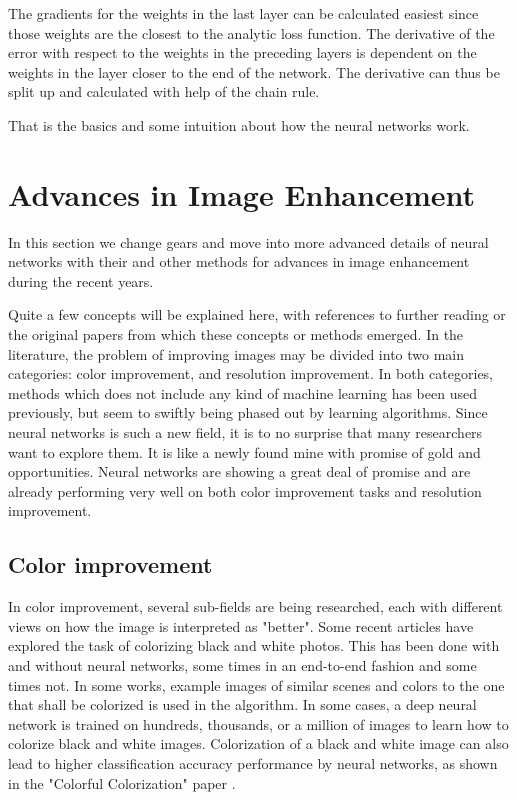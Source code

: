 The gradients for the weights in the last layer can be calculated easiest since those weights are the closest to the analytic loss function. The derivative of the error with respect to the weights in the preceding layers is dependent on the weights in the layer closer to the end of the network. The derivative can thus be split up and calculated with help of the chain rule.  

That is the basics and some intuition about how the neural networks work. 

\section{Advances in Image Enhancement}
In this section we change gears and move into more advanced details of neural networks with their and other methods for advances in image enhancement during the recent years.

Quite a few concepts will be explained here, with references to further reading or the original papers from which these concepts or methods emerged. In the literature, the problem of improving images may be divided into two main categories: color improvement, and resolution improvement. In both categories, methods which does not include any kind of machine learning has been used previously, but seem to swiftly being phased out by learning algorithms. Since neural networks is such a new field, it is to no surprise that many researchers want to explore them. It is like a newly found mine with promise of gold and opportunities. Neural networks are showing a great deal of promise and are already  performing very well on both color improvement tasks and resolution improvement. 


\subsection{Color improvement}
In color improvement, several sub-fields are being researched, each with different views on how the image is interpreted as "better". Some recent articles have explored the task of colorizing black and white photos. This has been done with and without neural networks, some times in an end-to-end fashion and some times not. In some works, example images of similar scenes and colors to the one that shall be colorized is used in the algorithm. In some cases, a deep neural network is trained on hundreds, thousands, or a million of images to learn how to colorize black and white images. Colorization of a black and white image can also lead to higher classification accuracy performance by neural networks, as shown in the "Colorful Colorization" paper \citep{Colorful-colorization}. 

